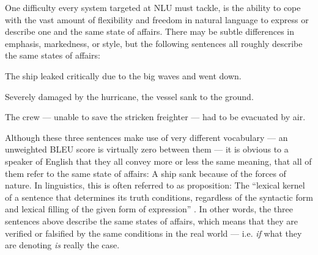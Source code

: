 
One difficulty every system targeted at NLU must tackle, is the ability to cope with the
vast amount of flexibility and freedom in natural language to express or describe
one and the same state of affairs. There may be subtle differences in emphasis,
markedness, or style, but the following sentences all roughly describe the same
states of affairs:

\begin{examples}
  \item The ship leaked critically due to the big waves and went down.
  \item \label{ex:sinking-sent} Severely damaged by the hurricane, the vessel sank to the ground.
  \item The crew --- unable to save the stricken freighter --- had to be evacuated by air.
\end{examples}

Although these three sentences make use of very different vocabulary --- an unweighted
BLEU score is virtually zero between them --- it is obvious to a speaker of English
that they all convey more or less the same meaning, that all of them refer to the same
state of affairs: A ship sank because of the forces of nature. In linguistics, this is
often referred to as proposition: The ``lexical kernel of a sentence that determines
its truth conditions, regardless of the syntactic form and lexical filling of the given
form of expression'' \cite[p.~959]{bussmann2006routledge}. In other words, the three
sentences above describe the same states of affairs, which means that they are verified
or falsified by the same conditions in the real world --- i.e. \emph{if} what they are
denoting \emph{is} really the case.

